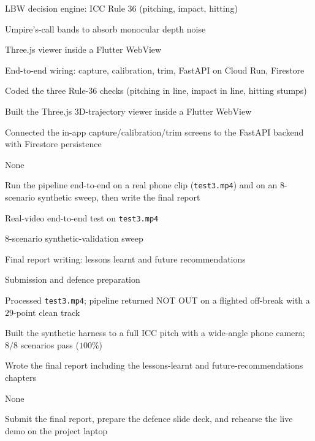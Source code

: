 \documentclass[12pt,a4paper]{report}
\begin{document}
%
{\begin{lblist}
\item LBW decision engine: ICC Rule 36 (pitching, impact, hitting)
\item Umpire's-call bands to absorb monocular depth noise
\item Three.js viewer inside a Flutter WebView
\item End-to-end wiring: capture, calibration, trim, FastAPI on Cloud Run, Firestore
\end{lblist}}%
{\begin{lblist}
\item Coded the three Rule-36 checks (pitching in line, impact in line, hitting stumps)
\item Built the Three.js 3D-trajectory viewer inside a Flutter WebView
\item Connected the in-app capture/calibration/trim screens to the FastAPI backend with Firestore persistence
\end{lblist}}%
{\begin{lblist}\item None\end{lblist}}%
{\begin{lblist}\item Run the pipeline end-to-end on a real phone clip (\texttt{test3.mp4}) and on an 8-scenario synthetic sweep, then write the final report\end{lblist}}

%
{\begin{lblist}
\item Real-video end-to-end test on \texttt{test3.mp4}
\item 8-scenario synthetic-validation sweep
\item Final report writing: lessons learnt and future recommendations
\item Submission and defence preparation
\end{lblist}}%
{\begin{lblist}
\item Processed \texttt{test3.mp4}; pipeline returned NOT OUT on a flighted off-break with a $29$-point clean track
\item Built the synthetic harness to a full ICC pitch with a wide-angle phone camera; $8/8$ scenarios pass ($100\%$)
\item Wrote the final report including the lessons-learnt and future-recommendations chapters
\end{lblist}}%
{\begin{lblist}\item None\end{lblist}}%
{\begin{lblist}\item Submit the final report, prepare the defence slide deck, and rehearse the live demo on the project laptop\end{lblist}}
\end{document}
